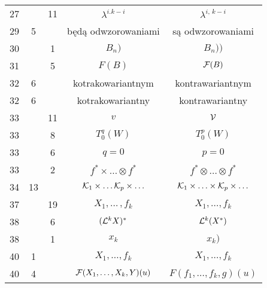 \documentclass[a4paper,11pt]{article}
\begin{document}
\begin{center}
\begin{tabular}{|c|c|c|c|c|}
    27  & & 11 & $\lambda^{ i. k - i }$ & $\lambda^{ i,\, k - i }$ \\
    29  &  5 & & będą odwzorowaniami & są odwzorowaniami \\
    30  & &  1 & $B_{ n } )$ & $B_{ n } ) )$ \\
    31  & &  5 & $F( B )$ & $\mathcal{F}( B )$ \\
    32  &  6 & & kotrakowariantnym & kontrawariantnym \\
    32  &  6 & & kotrakowariantny & kontrawariantny \\
    33  & & 11 & $v$ & $\mathcal{V}$ \\
    33  & &  8 & $T_{ 0 }^{ q }( W )$ & $T_{ 0 }^{ p }( W )$ \\
    33  & &  6 & $q = 0$ & $p = 0$ \\
    33  & &  2 & $f^{ * } \times \ldots \otimes f^{ * }$
           & $f^{ * } \otimes \ldots \otimes f^{ * }$ \\
    34  & 13 & & $\mathcal{K}_{ 1 } \times \ldots \mathcal{K}_{ p } \times \ldots$
           & $\mathcal{K}_{ 1 } \times \ldots \times \mathcal{K}_{ p } \times \ldots$ \\
    37  & & 19 & $X_{ 1 }, \ldots\, , f_{ k }$ & $X_{ 1 }, \ldots, f_{ k }$ \\
    38  & &  6 & $( \mathcal{L}^{ k } X )^{ * }$ & $\mathcal{L}^{ k }( X^{ * } )$ \\
    38  & &  1 & $x_{ k }$ & $x_{ k } )$ \\
    40  &  1 & & $X_{ 1 }, \! \ldots, f_{ k }$
           & $X_{ 1 }, \ldots, f_{ k }$ \\
    40  &  4 & & $\mathcal{F}( X_{ 1 }, \ldots, X_{ k }, Y )( u )$
           & $F( f_{ 1 }, \ldots, f_{ k }, g )( u )$ \\
    \hline
  \end{tabular}






\end{center}
\end{document}
